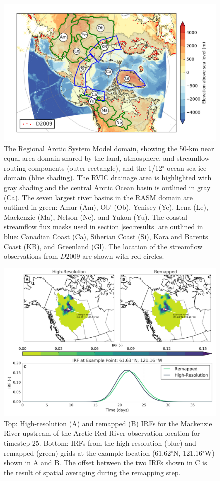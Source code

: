 \documentclass[jgrga, draft]{agutex}
\begin{document}
\clearpage
\begin{figure}
\noindent\includegraphics[width=40pc,natwidth=1]{RASM_domain_fig}
\caption{The Regional Arctic System Model domain, showing the 50-km near equal area domain shared by the land, atmosphere, and streamflow routing components (outer rectangle), and the 1/12$^\circ$ ocean-sea ice domain (blue shading).
The RVIC drainage area is highlighted with gray shading and the central Arctic Ocean basin is outlined in gray (Ca).
The seven largest river basins in the RASM domain are outlined in green: Amur (Am), Ob' (Ob), Yenisey (Ye), Lena (Le), Mackenzie (Ma), Nelson (Ne), and Yukon (Yu).
The coastal streamflow flux masks used in section \ref{sec:results} are outlined in blue: Canadian Coast (Ca), Siberian Coast (Si), Kara and Barents Coast (KB), and Greenland (Gl).
The location of the streamflow observations from $D2009$ are shown with red circles.}
\label{fig:rasm_domain}
\end{figure}

\clearpage
\begin{figure}
\noindent\includegraphics[width=40pc,natwidth=1]{uh_remap_schematic}
\caption{Top: High-resolution (A) and remapped (B) IRFs for the Mackenzie River upstream of the Arctic Red River observation location for timestep 25.
Bottom: IRFs from the high-resolution (blue) and remapped (green) grids at the example location (61.62$^\circ$N, 121.16$^\circ$W) shown in A and B.
The offset between the two IRFs shown in C is the result of spatial averaging during the remapping step.}
\label{fig:uh_remap_schematic}
\end{figure}
\end{document}
